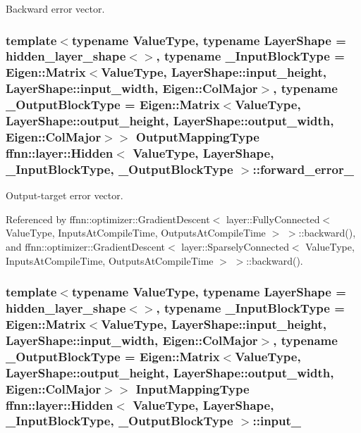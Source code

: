 Backward error vector. 

\hypertarget{classffnn_1_1layer_1_1_hidden_af1f439bdd3645a5ee444455d822b5143}{
\subsubsection[{forward\-\_\-error\-\_\-}]{\setlength{\rightskip}{0pt plus 5cm}template$<$typename Value\-Type, typename Layer\-Shape = hidden\-\_\-layer\-\_\-shape$<$$>$, typename \-\_\-\-Input\-Block\-Type = Eigen\-::\-Matrix$<$\-Value\-Type, Layer\-Shape\-::input\-\_\-height,  Layer\-Shape\-::input\-\_\-width,  Eigen\-::\-Col\-Major$>$, typename \-\_\-\-Output\-Block\-Type = Eigen\-::\-Matrix$<$\-Value\-Type, Layer\-Shape\-::output\-\_\-height, Layer\-Shape\-::output\-\_\-width, Eigen\-::\-Col\-Major$>$$>$ {\bf Output\-Mapping\-Type} {\bf ffnn\-::layer\-::\-Hidden}$<$ Value\-Type, Layer\-Shape, \-\_\-\-Input\-Block\-Type, \-\_\-\-Output\-Block\-Type $>$\-::forward\-\_\-error\-\_\-\hspace{0.3cm}{\ttfamily [protected]}}}\label{classffnn_1_1layer_1_1_hidden_af1f439bdd3645a5ee444455d822b5143}


Output-\/target error vector. 



Referenced by ffnn\-::optimizer\-::\-Gradient\-Descent$<$ layer\-::\-Fully\-Connected$<$ Value\-Type, Inputs\-At\-Compile\-Time, Outputs\-At\-Compile\-Time $>$ $>$\-::backward(), and ffnn\-::optimizer\-::\-Gradient\-Descent$<$ layer\-::\-Sparsely\-Connected$<$ Value\-Type, Inputs\-At\-Compile\-Time, Outputs\-At\-Compile\-Time $>$ $>$\-::backward().

\hypertarget{classffnn_1_1layer_1_1_hidden_a1177e86b75ad7ba87aa4e855defa5851}{
\subsubsection[{input\-\_\-}]{\setlength{\rightskip}{0pt plus 5cm}template$<$typename Value\-Type, typename Layer\-Shape = hidden\-\_\-layer\-\_\-shape$<$$>$, typename \-\_\-\-Input\-Block\-Type = Eigen\-::\-Matrix$<$\-Value\-Type, Layer\-Shape\-::input\-\_\-height,  Layer\-Shape\-::input\-\_\-width,  Eigen\-::\-Col\-Major$>$, typename \-\_\-\-Output\-Block\-Type = Eigen\-::\-Matrix$<$\-Value\-Type, Layer\-Shape\-::output\-\_\-height, Layer\-Shape\-::output\-\_\-width, Eigen\-::\-Col\-Major$>$$>$ {\bf Input\-Mapping\-Type} {\bf ffnn\-::layer\-::\-Hidden}$<$ Value\-Type, Layer\-Shape, \-\_\-\-Input\-Block\-Type, \-\_\-\-Output\-Block\-Type $>$\-::input\-\_\-\hspace{0.3cm}{\ttfamily [protected]}}}\label{classffnn_1_1layer_1_1_hidden_a1177e86b75ad7ba87aa4e855defa5851}


